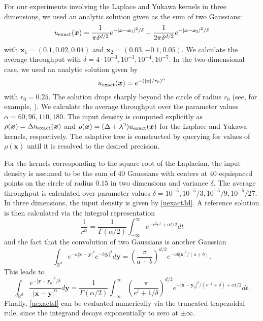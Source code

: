 \documentclass[final,letterpaper]{siamart171218}
\newcommand{\be}{\begin{equation}}
\newcommand{\ee}{\end{equation}}
\newcommand{\x}{\boldsymbol{x}}
\newcommand{\y}{\boldsymbol{y}}
\begin{document}
For our experiments involving the Laplace and Yukawa kernels in three dimensions, 
we used an analytic solution given as the sum of two Gaussians:
\be\label{uexact3d}
u_{\rm exact}(\x)=\frac{1}{\pi\delta^{d/2}}e^{-|\x-\x_1|^2/\delta}-\frac{1}{2\pi\delta^{d/2}}e^{-|\x-\x_2|^2/\delta}
\ee
with 
$\x_1=(0.1,0.02,0.04)$ and $\x_2=(0.03,-0.1,0.05)$.
We calculate the average throughput with
$\delta=4\cdot 10^{-3}, 10^{-3}, 10^{-4}, 10^{-5}$.
In the two-dimensional case, we used an analytic solution given by
\be\label{uexact2d}
u_{\rm exact}(\x) = e^{-(|\x|/r_0)^\alpha}
\ee
with $r_0=0.25$. The solution drops sharply beyond the circle of radius $r_0$
(see, for example, \cite{biros2015cicp,pvfmm}).
We calculate the average throughput over the parameter values $\alpha=60, 96, 110, 180$.
The input density is computed explicitly as $\rho(\x)=\Delta u_{\rm exact}(\x)$
and $\rho(\x)=(\Delta+\lambda^2) u_{\rm exact}(\x)$ for the Laplace and
Yukawa kernels, respectively. The adaptive tree is constructed by querying for values of
$\rho(\x)$ until it is resolved to the desired precision.

For the kernels corresponding to the square-root of the Laplacian, the input density
is assumed to be the sum of $40$ Gaussians with centers at $40$ equispaced points
on the circle of radius $0.15$ in two dimensions and variance $\delta$.
The average throughput is calculated over parameter values
$\delta=10^{-5}, 10^{-5}/3, 10^{-5}/9, 10^{-5}/27$.
In three dimensions, the input density is given by \cref{uexact3d}.
A reference solution is then calculated via the integral representation
\be
\frac{1}{r^\alpha}=\frac{1}{\Gamma(\alpha/2)}\int_{-\infty}^{\infty} e^{-r^2 e^t+\alpha t/2} dt
\ee
and the fact that the convolution of two Gaussians is another Gaussian
\be
\int_{\mathbb{R}^d} e^{-a|\x-\y|^2}e^{-b|\y|^2}d\y = \left(\frac{\pi}{a+b}\right)^{d/2}e^{-ab|\x|^2/(a+b)}.
\ee
This leads to
\be\label{uexactsl}
\int_{\mathbb{R}^d} \frac{e^{-|\y-\y_0|^2/\delta}}{|\x-\y|^\alpha}
d\y =\frac{1}{\Gamma(\alpha/2)}
\int_{-\infty}^{\infty} \left(\frac{\pi}{e^t+1/\delta}\right)^{d/2}
e^{-|\x-\y_0|^2/(e^{-t}+\delta)+\alpha t/2} dt.
\ee
Finally, \cref{uexactsl} can be evaluated numerically via the truncated trapezoidal rule,
since the integrand decays exponentially to zero at $\pm \infty$.
\end{document}
